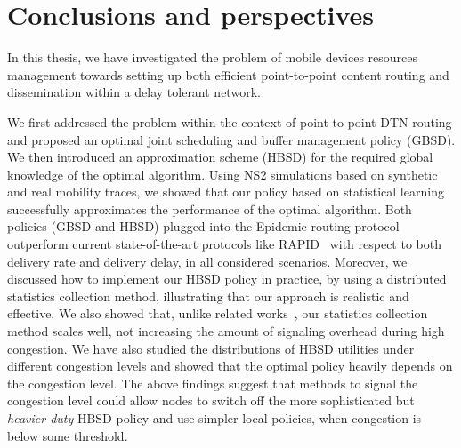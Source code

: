 ﻿\chapter{Conclusions and perspectives}
\label{chapter:conclusions}

In this thesis, we have investigated the problem of mobile devices resources management towards setting up both efficient point-to-point content routing and dissemination within a delay tolerant network.
  
We first addressed the problem within the context of point-to-point DTN routing and proposed an optimal joint scheduling and buffer management policy (GBSD). We then introduced an approximation scheme (HBSD) for the required global knowledge of the optimal algorithm. Using NS2 simulations based on synthetic and real mobility traces, we showed that our policy based on statistical learning successfully approximates the performance of the optimal algorithm. Both policies (GBSD and HBSD) plugged into the Epidemic routing protocol outperform current state-of-the-art protocols like RAPID~\cite{Levine:Sigcomm07} with respect to both delivery rate and delivery delay, in all considered scenarios. Moreover, we discussed how to implement our HBSD policy in practice, by using a distributed statistics collection method, illustrating that our approach is realistic and effective. We also showed that, unlike related works~\cite{Levine:Sigcomm07, AOBM}, our statistics collection method scales well, not increasing the amount of signaling overhead during high congestion. We have also studied the distributions of HBSD utilities under different congestion levels and showed that the optimal policy heavily depends on the congestion level. The above findings suggest that methods to signal the congestion level could allow nodes to switch off the more sophisticated but \emph{heavier-duty} HBSD policy and use simpler local policies, when congestion is below some threshold. 

